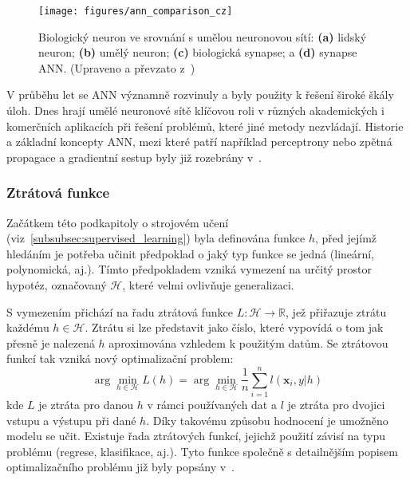 \begin{figure}[!htb]
    \begin{center}
        \texttt{[image: figures/ann\_comparison\_cz]}
        \caption{Biologický neuron ve srovnání s umělou neuronovou sítí: \textbf{(a)}
            lidský neuron; \textbf{(b)} umělý neuron; \textbf{(c)} biologická
            synapse; a \textbf{(d)} synapse ANN. (Upraveno a převzato
            z~\cite{suzuki2013})}
        \label{fig:ann_comparison}
    \end{center}
\end{figure}

V průběhu let se \gls{ANN} významně rozvinuly a byly použity k řešení široké
škály úloh. Dnes hrají umělé neuronové sítě klíčovou roli v různých akademických
i komerčních aplikacích při řešení problémů, které jiné metody nezvládají.
Historie a základní koncepty \gls{ANN}, mezi které patří například perceptrony
nebo zpětná propagace a gradientní sestup byly již rozebrány
v~\cite{Aurelien2022,Murphy2012,Goodfellow2016}.

\subsubsection{Ztrátová funkce}
Začátkem této podkapitoly o strojovém učení
(viz~\ref{subsubsec:supervised_learning}) byla definována funkce $h$, před
jejímž hledáním je potřeba učinit předpoklad o jaký typ funkce se jedná
(lineární, polynomická, aj.). Tímto předpokladem vzniká vymezení na určitý
prostor hypotéz, označovaný $\mathcal{H}$, které velmi ovlivňuje generalizaci.

S vymezením přichází na řadu ztrátová funkce $L:\mathcal{H} \rightarrow
    \mathbb{R}$, jež přiřazuje ztrátu každému $h \in \mathcal{H}$. Ztrátu si lze
představit jako číslo, které vypovídá o tom jak přesně je nalezená $h$
aproximována vzhledem k použitým datům. Se ztrátovou funkcí tak vzniká nový
optimalizační problem:
\begin{equation}
    \arg\min_{h \in \mathcal{H}} L(h) = \arg\min_{h \in \mathcal{H}} \frac{1}{n}\sum_{i=1}^nl(\textbf{x}_i,y|h)
\end{equation}
kde $L$ je ztráta pro danou $h$ v rámci používaných dat a $l$ je ztráta pro
dvojici vstupu a výstupu při dané $h$. Díky takovému způsobu hodnocení je
umožněno modelu se učit. Existuje řada ztrátových funkcí, jejichž použití závisí
na typu problému (regrese, klasifikace, aj.). Tyto funkce společně s
detailnějším popisem optimalizačního problému již byly popsány
v~\cite{Murphy2012}.

